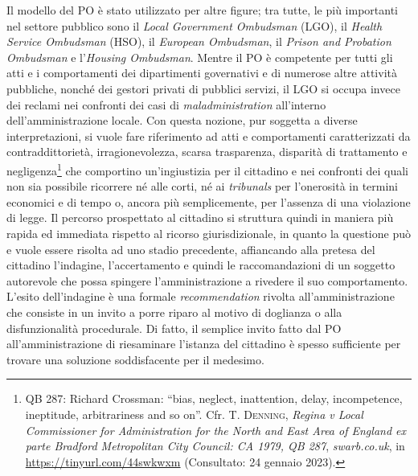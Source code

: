 \documentclass[12pt,it,a4paper,]{report}
\begin{document}
Il modello del PO è stato utilizzato per altre figure; tra tutte, le più
importanti nel settore pubblico sono il \emph{Local Government
Ombudsman} (LGO), il \emph{Health Service Ombudsman} (HSO), il
\emph{European Ombudsman}, il \emph{Prison and Probation Ombudsman} e
l'\emph{Housing Ombudsman}. Mentre il PO è competente per tutti gli atti
e i comportamenti dei dipartimenti governativi e di numerose altre
attività pubbliche, nonché dei gestori privati di pubblici servizi, il
LGO si occupa invece dei reclami nei confronti dei casi di
\emph{maladministration} all'interno dell'amministrazione locale. Con
questa nozione, pur soggetta a diverse interpretazioni, si vuole fare
riferimento ad atti e comportamenti caratterizzati da contraddittorietà,
irragionevolezza, scarsa trasparenza, disparità di trattamento e
negligenza\footnote{QB 287: Richard Crossman: ``bias, neglect,
  inattention, delay, incompetence, ineptitude, arbitrariness and so
  on''. Cfr. T. \textsc{Denning}, \emph{Regina v Local Commissioner for
  Administration for the North and East Area of England ex parte
  Bradford Metropolitan City Council: CA 1979, QB 287},
  \emph{swarb.co.uk}, in \url{https://tinyurl.com/44swkwxm} (Consultato:
  24 gennaio 2023).} che comportino un'ingiustizia per il cittadino e
nei confronti dei quali non sia possibile ricorrere né alle corti, né ai
\emph{tribunals} per l'onerosità in termini economici e di tempo o,
ancora più semplicemente, per l'assenza di una violazione di legge. Il
percorso prospettato al cittadino si struttura quindi in maniera più
rapida ed immediata rispetto al ricorso giurisdizionale, in quanto la
questione può e vuole essere risolta ad uno stadio precedente,
affiancando alla pretesa del cittadino l'indagine, l'accertamento e
quindi le raccomandazioni di un soggetto autorevole che possa spingere
l'amministrazione a rivedere il suo comportamento. L'esito dell'indagine
è una formale \emph{recommendation} rivolta all'amministrazione che
consiste in un invito a porre riparo al motivo di doglianza o alla
disfunzionalità procedurale. Di fatto, il semplice invito fatto dal PO
all'amministrazione di riesaminare l'istanza del cittadino è spesso
sufficiente per trovare una soluzione soddisfacente per il medesimo.
\end{document}
